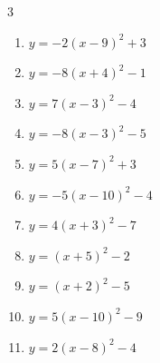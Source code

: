 \begin{multicols}{3}
\begin{enumerate}
        \phantom{$\displaystyle 頂点\left( -6 , -1 \right)$}

  \item $\displaystyle y=-2\left( x-9\right)^{2}+3$

        \phantom{$\displaystyle 頂点\left( 9 , 3 \right)$}

  \item $\displaystyle y=-8\left( x+4\right)^{2}-1$

        \phantom{$\displaystyle 頂点\left( -4 , -1 \right)$}

  \item $\displaystyle y=7\left( x-3\right)^{2}-4$

        \phantom{$\displaystyle 頂点\left( 3 , -4 \right)$}

  \item $\displaystyle y=-8\left( x-3\right)^{2}-5$

        \phantom{$\displaystyle 頂点\left( 3 , -5 \right)$}

  \item $\displaystyle y=5\left( x-7\right)^{2}+3$

        \phantom{$\displaystyle 頂点\left( 7 , 3 \right)$}

  \item $\displaystyle y=-5\left( x-10\right)^{2}-4$

        \phantom{$\displaystyle 頂点\left( 10 , -4 \right)$}

\columnbreak %

\resetques

  \item $\displaystyle y=4\left( x+3\right)^{2}-7$

        \phantom{$\displaystyle 頂点\left( -3 , -7 \right)$}

  \item $\displaystyle y=\left( x+5\right)^{2}-2$

        \phantom{$\displaystyle 頂点\left( -5 , -2 \right)$}

  \item $\displaystyle y=\left( x+2\right)^{2}-5$

        \phantom{$\displaystyle 頂点\left( -2 , -5 \right)$}

  \item $\displaystyle y=5\left( x-10\right)^{2}-9$

        \phantom{$\displaystyle 頂点\left( 10 , -9 \right)$}

  \item $\displaystyle y=2\left( x-8\right)^{2}-4$


\end{enumerate}
\end{multicols}
